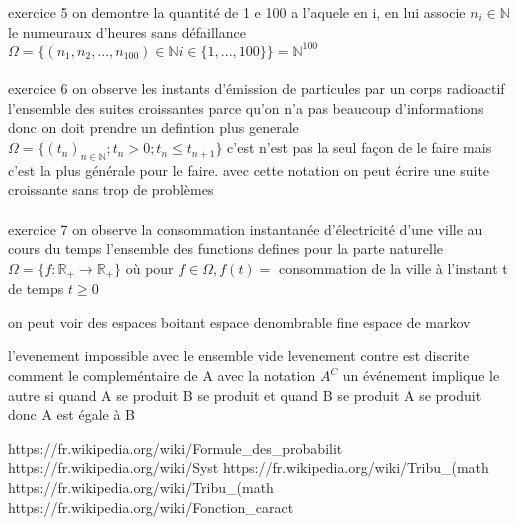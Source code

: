 \documentclass{article}
\begin{document}
exercice 5
on demontre la quantité de 1 e 100 a l'aquele en i, en lui associe $n_i \in \mathbb{N}$ le numeuraux d'heures sans défaillance
$\Omega = \{ (n_1, n_2, ..., n_{100}) \in \mathbb{N} i\in\{1, ..., 100\}\} = \mathbb{N}^{100}$
\\\\

exercice 6
on observe les instants d'émission de particules par un corps radioactif
l'ensemble des suites croissantes parce qu'on n'a pas beaucoup d'informations donc on doit prendre un defintion plus generale
$\Omega = \{ (t_{n})_{n \in \mathbb{N}} ; t_{n} > 0 ; t_{n} \leq t_{n+1}\}$
c'est n'est pas la seul façon de le faire mais c'est la plus générale pour le faire. avec cette notation on peut écrire une suite croissante sans trop de problèmes
\\\\

exercice 7
on observe la consommation instantanée d'électricité d'une ville au cours du temps
l'ensemble des functions defines pour la parte naturelle
$\Omega = \{ f : \mathbb{R}_{+} \to \mathbb{R}_{+} \}$ où pour $f \in \Omega, f(t) =$ consommation de la ville à l'instant t de temps $t\geq 0$

on peut voir des espaces boitant espace denombrable fine
espace de markov

l'evenement impossible avec le ensemble vide
levenement contre est discrite comment le compleméntaire de A avec la notation $A^{C}$
un événement implique le autre si quand A se produit B se produit et quand B se produit A se produit donc A est égale à B

https://fr.wikipedia.org/wiki/Formule_des_probabilit%
https://fr.wikipedia.org/wiki/Syst%
https://fr.wikipedia.org/wiki/Tribu_(math%
https://fr.wikipedia.org/wiki/Tribu_(math%
https://fr.wikipedia.org/wiki/Fonction_caract%
\end{document}
